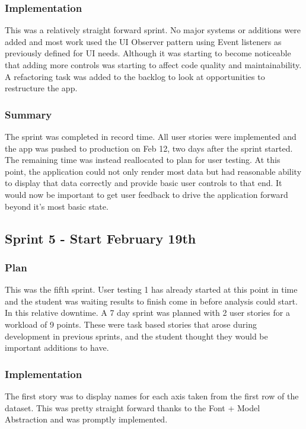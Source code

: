 \subsubsection{Implementation}
This was a relatively straight forward sprint. No major systems or additions were added and most work used the UI Observer pattern using Event listeners as previously defined for UI needs. Although it was starting to become noticeable that adding more controls was starting to affect code quality and maintainability. A refactoring task was added to the backlog to look at opportunities to restructure the app.

\subsubsection{Summary}
The sprint was completed in record time. All user stories were implemented and the app was pushed to production on Feb 12, two days after the sprint started. The remaining time was instead reallocated to plan for user testing. At this point, the application could not only render most data but had reasonable ability to display that data correctly and provide basic user controls to that end. It would now be important to get user feedback to drive the application forward beyond it's most basic state.

\subsection{Sprint 5 - Start February 19th}
\subsubsection{Plan}
This was the fifth sprint. User testing 1 has already started at this point in time and the student was waiting results to finish come in before analysis could start.
In this relative downtime. A 7 day sprint was planned with 2 user stories for a workload of 9 points. These were task based stories that arose during development in previous sprints, and the student thought they would be important additions to have.

\subsubsection{Implementation}
The first story was to display names for each axis taken from the first row of the dataset. This was pretty straight forward thanks to the Font + Model Abstraction and was promptly implemented.

